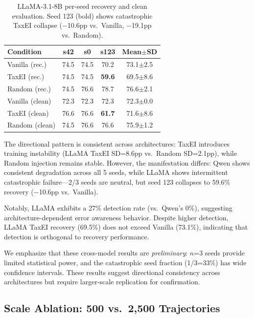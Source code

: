 \documentclass[11pt]{article}
\begin{document}
\begin{table}[t]
\centering
\small
\begin{tabular}{lcccc}
\toprule
\textbf{Condition} & \textbf{s42} & \textbf{s0} & \textbf{s123} & \textbf{Mean$\pm$SD} \\
\midrule
Vanilla (rec.) & 74.5 & 74.5 & 70.2 & 73.1\scriptsize{$\pm$2.5} \\
TaxEI (rec.) & 74.5 & 74.5 & \textbf{59.6} & 69.5\scriptsize{$\pm$8.6} \\
Random (rec.) & 74.5 & 76.6 & 78.7 & 76.6\scriptsize{$\pm$2.1} \\
\midrule
Vanilla (clean) & 72.3 & 72.3 & 72.3 & 72.3\scriptsize{$\pm$0.0} \\
TaxEI (clean) & 76.6 & 76.6 & \textbf{61.7} & 71.6\scriptsize{$\pm$8.6} \\
Random (clean) & 74.5 & 76.6 & 76.6 & 75.9\scriptsize{$\pm$1.2} \\
\bottomrule
\end{tabular}
\caption{LLaMA-3.1-8B per-seed recovery and clean evaluation. Seed 123 (bold) shows catastrophic TaxEI collapse ($-$10.6pp vs.\ Vanilla, $-$19.1pp vs.\ Random).}
\label{tab:llama-perseed}
\end{table}

The directional pattern is consistent across architectures: TaxEI introduces training instability (LLaMA TaxEI SD=8.6pp vs.\ Random SD=2.1pp), while Random injection remains stable.
However, the manifestation differs: Qwen shows consistent degradation across all 5 seeds, while LLaMA shows intermittent catastrophic failure---2/3 seeds are neutral, but seed 123 collapses to 59.6\% recovery ($-$10.6pp vs.\ Vanilla).

Notably, LLaMA exhibits a 27\% detection rate (vs.\ Qwen's 0\%), suggesting architecture-dependent error awareness behavior.
Despite higher detection, LLaMA TaxEI recovery (69.5\%) does not exceed Vanilla (73.1\%), indicating that detection is orthogonal to recovery performance.

We emphasize that these cross-model results are \emph{preliminary}: $n$=3 seeds provide limited statistical power, and the catastrophic seed fraction (1/3=33\%) has wide confidence intervals.
These results suggest directional consistency across architectures but require larger-scale replication for confirmation.

\subsection{Scale Ablation: 500 vs.\ 2,500 Trajectories}
\label{sec:scale}
\end{document}
